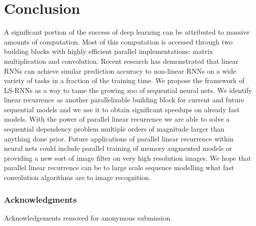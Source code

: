 \documentclass{article}
\begin{document}
\section{Conclusion}
A significant portion of the success of deep learning can be attributed to massive
amounts of computation. Most of this computation is accessed through two
building blocks with highly efficient parallel implementations:
matrix multiplication and convolution. Recent research has demonstrated that
linear RNNs can achieve similar prediction accuracy to non-linear RNNs on a wide
variety of tasks in a fraction of the training time. We propose the framework of
LS-RNNs as a way to tame the growing zoo of sequential neural nets. We identify linear
recurrence as another parallelizable building block for current and future sequential models
and we use it to obtain significant speedups on already fast models.
With the power of parallel
linear recurrence we are able to solve a sequential dependency problem multiple
orders of magnitude larger than anything done prior.
Future applications of parallel linear recurrence within neural nets could include
parallel training of memory augmented models or providing a new sort of image filter
on very high resolution images.
We hope that parallel linear recurrence can be to large scale sequence
modelling what fast convolution algorithms are to image recognition.

\subsubsection*{Acknowledgments}
Acknowledgements removed for anonymous submission.
\end{document}
